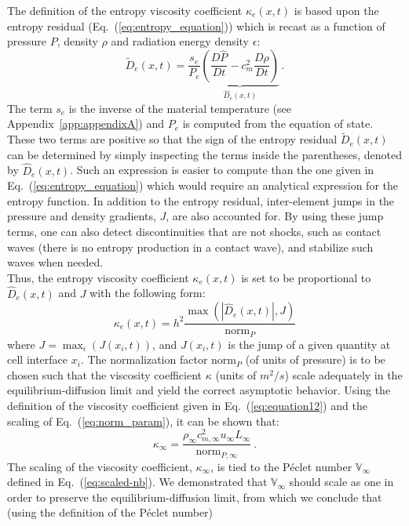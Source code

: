\documentclass[review]{elsarticle}
\newcommand{\eqt}[1]{Eq.~(\ref{#1})}                     %
\newcommand{\app}[1]{Appendix~\ref{#1}}                     %
\newcommand{\norm}{\textrm{norm}}
\newcommand{\Pe}{\textrm{P\'e}}
\renewcommand{\Pe}{\mathbb{V}_\infty}
\begin{document}
The definition of the entropy viscosity coefficient $\kappa_e(x,t)$ is based upon the entropy residual (\eqt{eq:entropy_equation}) which is recast as a function of pressure $P$, density $\rho$ and radiation energy density $\epsilon$:
\begin{equation}
\label{eq:equation9}
\tilde{D}_e(x,t) = \frac{s_e}{P_e} \underbrace{ \left( \frac{D\hat{P}}{Dt} - c_m^2 \frac{D\rho}{Dt} \right)}_\textrm{$\hat{D}_e(x,t)$} \,.
\end{equation}
The term $s_e$ is the inverse of the material temperature (see \app{app:appendixA}) and $P_e$ is computed from the equation of state. These two terms are positive so that the sign of the entropy residual $\tilde{D}_e(x,t)$ can be determined by simply inspecting the terms inside the parentheses, denoted by $\hat{D}_e(x,t)$. Such an expression is easier to compute than the one given in \eqt{eq:entropy_equation} which would require an analytical expression for the entropy function. In addition to the entropy residual, inter-element jumps in the pressure and density gradients, $J$, are also accounted for. By using these jump terms, one can also detect discontinuities that are not shocks, such as contact waves (there is no entropy production in a contact wave), and stabilize such waves when needed. \\
Thus, the entropy viscosity coefficient $\kappa_e(x,t)$ is set to be proportional to $\hat{D}_e(x,t)$ and $J$ with the following form: 
\begin{equation}
\label{eq:equation12}
\kappa_e(x,t) = h^2 \frac{\max (|\hat{D}_e(x,t)|, J)}{\norm_P}
\end{equation} 
where $J = \max_i (J(x_i,t))$, and $J(x_i,t)$ is the jump of a given quantity at cell interface $x_i$. The normalization factor $\norm_P$ (of units of pressure) is to be chosen such that the viscosity coefficient $\kappa$ (units of $m^2/s$) scale adequately in the equilibrium-diffusion limit and yield the correct asymptotic behavior. Using the definition of the viscosity coefficient given in \eqt{eq:equation12} and the scaling of \eqt{eq:norm_param}, it can be shown that:
%
\begin{equation}\label{eq:kappa_infty}
\kappa_\infty = \frac{\rho_\infty c^2_{m,\infty} u_\infty L_\infty}{\norm_{P,\infty}} \ .
\end{equation}
%
The scaling of the viscosity coefficient, $\kappa_\infty$, is tied to the P\'eclet number $\Pe$ defined in \eqt{eq:scaled-nb}. We demonstrated that $\Pe$ should scale as one in order to preserve the equilibrium-diffusion limit, from which we conclude that (using the definition of the P\'eclet number) 
\end{document}
